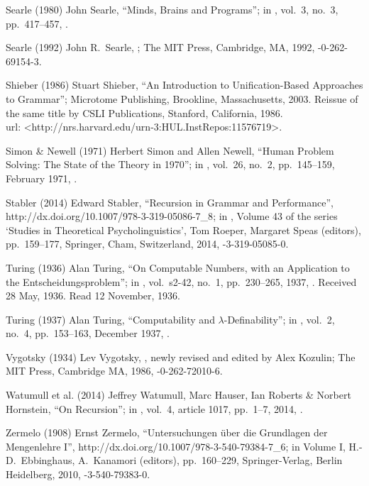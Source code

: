  Searle (1980)
John Searle,
``Minds, Brains and Programs'';
in ,
vol.\ 3, no.\ 3, pp.\ 417--457,
.

 Searle (1992)
John R.\ Searle,
;
The MIT Press, Cambridge, MA, 1992,
-0-262-69154-3.

 Shieber (1986)
Stuart Shieber,
``An Introduction to Unification-Based Approaches to Grammar'';
Microtome Publishing, Brookline, Massachusetts, 2003.
Reissue of the same title by
CSLI Publications, Stanford, California, 1986.\\
{\sc url:} \URL<http://nrs.harvard.edu/urn-3:HUL.InstRepos:11576719>.

 Simon \& Newell (1971)
Herbert Simon and Allen Newell,
``Human Problem Solving: The State of the Theory in 1970'';
in ,
 vol.\ 26, no.\ 2, pp.\ 145--159, February 1971,
.

 Stabler (2014)
Edward Stabler,
``Recursion in Grammar and Performance'',\\
%
{http://dx.doi.org/10.1007/978-3-319-05086-7_8};
in ,
Volume 43 of the series `Studies in Theoretical Psycholinguistics',
Tom Roeper, Margaret Speas (editors),
pp.\ 159--177,
Springer, Cham, Switzerland, 2014,
-3-319-05085-0.

 Turing (1936)
Alan Turing,
``On Computable Numbers,
 with an Application to the Entscheidungsproblem'';
in ,
vol.\ s2-42, no.\ 1, pp.\ 230--265, 1937,
.
Received 28 May, 1936. Read 12 November, 1936.

 Turing (1937)
Alan Turing,
``Computability and $\lambda$-Definability''; in
,
vol.\ 2, no.\ 4, pp.\ 153--163, December 1937,
.

 Vygotsky (1934)
Lev Vygotsky,
,
newly revised and edited by Alex Kozulin;
The MIT Press, Cambridge MA, 1986,
-0-262-72010-6.

 Watumull et al. (2014)
Jeffrey Watumull, Marc Hauser, Ian Roberts \& Norbert Hornstein,
``On Recursion''; in
,
vol.\ 4, article 1017, pp.\ 1--7, 2014,
.

 Zermelo (1908)
Ernst Zermelo,
``Untersuchungen \"uber die Grundlagen der Mengenlehre I'',
%
{http://dx.doi.org/10.1007/978-3-540-79384-7_6};
in  Volume I,
H.-D.\ Ebbinghaus, A.\ Kanamori (editors),
pp.\ 160--229,
Springer-Verlag, Berlin Heidelberg, 2010,
-3-540-79383-0.

\endinput
